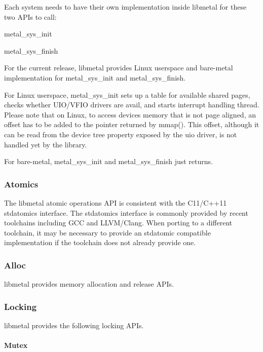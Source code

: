 Each system needs to have their own implementation inside libmetal for these two A\+P\+Is to call\+:
\begin{DoxyItemize}
\item metal\+\_\+sys\+\_\+init
\item metal\+\_\+sys\+\_\+finish
\end{DoxyItemize}

For the current release, libmetal provides Linux userspace and bare-\/metal implementation for metal\+\_\+sys\+\_\+init and metal\+\_\+sys\+\_\+finish.

For Linux userspace, metal\+\_\+sys\+\_\+init sets up a table for available shared pages, checks whether U\+I\+O/\+V\+F\+IO drivers are avail, and starts interrupt handling thread. Please note that on Linux, to access device\textquotesingle{}s memory that is not page aligned, an offset has to be added to the pointer returned by mmap(). This {\ttfamily offset}, although it can be read from the device tree property exposed by the uio driver, is not handled yet by the library.

For bare-\/metal, metal\+\_\+sys\+\_\+init and metal\+\_\+sys\+\_\+finish just returns.

\subsubsection*{Atomics}

The libmetal atomic operations A\+PI is consistent with the C11/\+C++11 stdatomics interface. The stdatomics interface is commonly provided by recent toolchains including G\+CC and L\+L\+V\+M/\+Clang. When porting to a different toolchain, it may be necessary to provide an stdatomic compatible implementation if the toolchain does not already provide one.

\subsubsection*{Alloc}

libmetal provides memory allocation and release A\+P\+Is.

\subsubsection*{Locking}

libmetal provides the following locking A\+P\+Is.

\paragraph*{Mutex}

